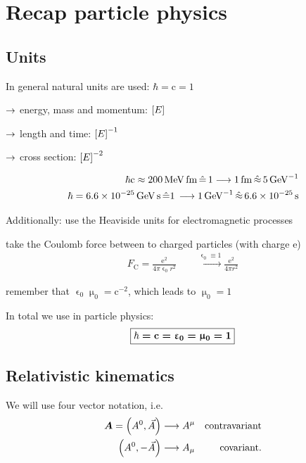 \chapter{Recap particle physics}
\section{Units}
In general natural units are used: $\hbar = \mathrm c = 1$
\begin{compactitem}
    \item[$\rightarrow$] energy, mass and momentum: $\qty[ E]$
    \item[$\rightarrow$] length and time: $\qty[ E] ^{-1}$
    \item[$\rightarrow$] cross section: $\qty[ E] ^{-2}$
\end{compactitem}
\begin{example}
\begin{align*}
    \hbar \mr c \approx \SI{200}{\mega\eV\femto\meter} \,\hat =\, 1 \longrightarrow \SI{1}{\femto \meter} \,\hat\approx\, \SI{5}{\per\giga\eV}\\
    \hbar = \SI{6.6 e-25}{\giga \eV \second} \,\hat = 1\, \longrightarrow \SI{1}{\per \giga \eV} \,\hat \approx\, \SI{6.6e-25}{\second}
\end{align*}
\end{example}

Additionally: use the Heaviside units for electromagnetic processes
\begin{compactitem}[$\rightarrow$]
    \item take the Coulomb force between to charged particles (with charge e)
    \begin{align*}
        F_\mathrm{C} = \frac{\mathrm e^2}{4 \pi \upvarepsilon_0 r^2} \qquad \overset{\upvarepsilon_0 \equiv 1}{\longrightarrow} \frac{\mathrm e^2}{4 \pi r^2}
    \end{align*}
    \item remember that $\upvarepsilon_0 \upmu_0 = \mathrm c^{-2}$, which leads to $\upmu_0 = 1$
\end{compactitem}
In total we use in particle physics:
\begin{align}
    \bm{\boxed{\hbar = \mathrm{c} = \upvarepsilon_0 = \upmu_0 = 1}}
\end{align}





\section{Relativistic kinematics}
We will use four vector notation, i.e.
\begin{align}
    {\bm{A}} = \qty( A^0, \vec A) \longrightarrow A^\mu & & \text{contravariant}\\
    \qty( A^0, -\vec A) \longrightarrow A_\mu & & \text{covariant.}
\end{align}
